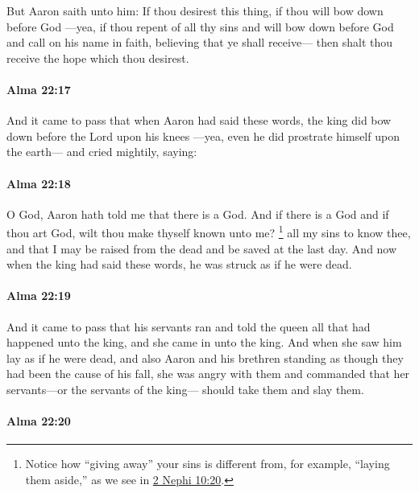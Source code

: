 			But Aaron saith unto him:
			If thou desirest this thing,
			if thou will bow down before God
			---yea, if thou repent of all thy sins
			and will bow down before God and call on his name in faith,
			believing that ye shall receive---
			then shalt thou receive the hope which thou desirest.

		\paragraph{Alma 22:17} %
			\label{ALMA-22-17}

			And it came to pass that when Aaron had said these words,
			the king did bow down before the Lord upon his knees
			---yea, even he did prostrate himself upon the earth---
			and cried mightily, saying:

		\paragraph{Alma 22:18} %
			\label{ALMA-22-18}

			O God, Aaron hath told me that there is a God.
			And if there is a God and if thou art God,
			wilt thou make thyself known unto me?
				\footnote{%
					Notice how ``giving away'' your sins is different from, for example, ``laying them aside,'' as we see in \hyperref[2NEPHI-10-20]{2 Nephi 10:20}.
					}
			all my sins to know thee,
			and that I may be raised from the dead and be saved at the last day.
			And now when the king had said these words,
			he was struck as if he were dead.

		\paragraph{Alma 22:19} %
			\label{ALMA-22-19}

			And it came to pass that his servants ran and told the queen
			all that had happened unto the king,
			and she came in unto the king.
			And when she saw him lay as if he were dead,
			and also Aaron and his brethren standing
			as though they had been the cause of his fall,
			she was angry with them
			and commanded that her servants---or the servants of the king---
			should take them and slay them.

		\paragraph{Alma 22:20} %
			\label{ALMA-22-20}

